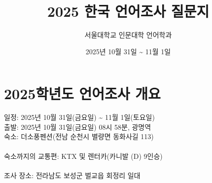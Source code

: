 \documentclass{snu-fl-questionnaire}
\title{2025 한국 언어조사 질문지}
\author{서울대학교 인문대학 언어학과}
\date{2025년 10월 31일 \textasciitilde{} 11월 1일}
\begin{document}
\frontmatter
\maketitle
\tableofcontents

\chapter{2025학년도 언어조사 개요}
일정: 2025년 10월 31일(금요일) {\textasciitilde} 11월 1일(토요일) \\
출발: 2025년 10월 31일(금요일) 08시 58분, 광명역 \\
숙소: 더소풍펜션(전남 순천시 별량면 동화사길 113) \\
\\
숙소까지의 교통편: KTX 및 렌터카(카니발 (D) 9인승) \\
\\
조사 장소: 전라남도 보성군 벌교읍 회정리 일대
\end{document}
